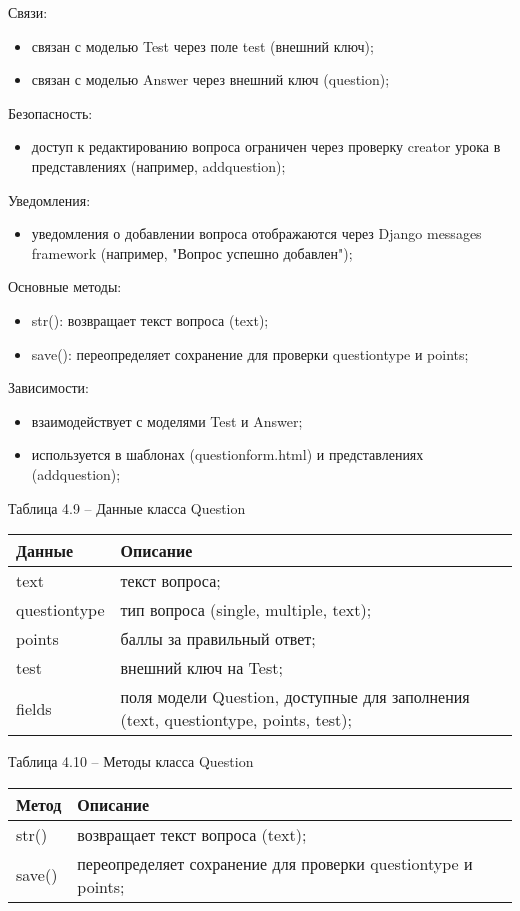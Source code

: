 Связи: 
\begin{itemize}
	\item связан с моделью Test через поле test (внешний ключ); 
	\item связан с моделью Answer через внешний ключ (question); 
\end{itemize}

Безопасность: 
\begin{itemize}
	\item доступ к редактированию вопроса ограничен через проверку creator урока в представлениях (например, addquestion); 
\end{itemize}

Уведомления: 
\begin{itemize}
	\item уведомления о добавлении вопроса отображаются через Django messages framework (например, "Вопрос успешно добавлен"); 
\end{itemize}

Основные методы: 
\begin{itemize}
	\item str(): возвращает текст вопроса (text); 
	\item save(): переопределяет сохранение для проверки questiontype и points; 
\end{itemize}

Зависимости: 
\begin{itemize}
	\item взаимодействует с моделями Test и Answer; 
	\item используется в шаблонах (questionform.html) и представлениях (addquestion); 
\end{itemize}

Таблица 4.9 – Данные класса Question \\
\begin{tabular}{|p{4cm}|p{8cm}|}
	\hline
	Данные & Описание \\
	\hline
	text & текст вопроса; \\
	questiontype & тип вопроса (single, multiple, text); \\
	points & баллы за правильный ответ; \\
	test & внешний ключ на Test; \\
	fields & поля модели Question, доступные для заполнения (text, questiontype, points, test); \\
	\hline
\end{tabular}

Таблица 4.10 – Методы класса Question \\
\begin{tabular}{|p{4cm}|p{8cm}|}
	\hline
	Метод & Описание \\
	\hline
	str() & возвращает текст вопроса (text); \\
	save() & переопределяет сохранение для проверки questiontype и points; \\
	\hline
\end{tabular}

